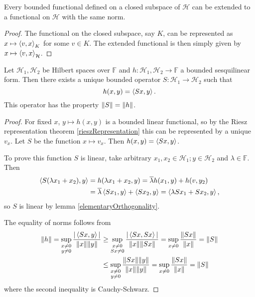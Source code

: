 \begin{corollary}
Every bounded functional defined on a closed subspace of $\mathcal{H}$ can be extended to a functional on $\mathcal{H}$ with the same norm.
\end{corollary}
\begin{proof}
The functional on the closed subspace, say $K$, can be represented as $x\mapsto \left\langle v,x \right\rangle_K$ for some $v\in K$. The extended functional is then simply given by $x\mapsto \left\langle v,x \right\rangle_\mathcal{H}$.
\end{proof}

\begin{proposition} \label{sesquilinearRepresentation}
Let $\mathcal{H}_1,\mathcal{H}_2$ be Hilbert spaces over $\mathbb{F}$ and $h:\mathcal{H}_1,\mathcal{H}_2\to\mathbb{F}$ a bounded sesquilinear form. Then there exists a unique bounded operator $S:\mathcal{H}_1 \to \mathcal{H}_2$ such that
\[ h(x,y) = \left\langle Sx,y \right\rangle. \]
This operator has the property $\lVert S\rVert = \lVert h\rVert$.
\end{proposition}
\begin{proof}
For fixed $x$, $y\mapsto h(x,y)$ is a bounded linear functional, so by the Riesz representation theorem \ref{rieszRepresentation} this can be represented by a unique $v_x$. Let $S$ be the function $x\mapsto v_x$. Then $h(x,y) = \left\langle Sx,y \right\rangle$.

To prove this function $S$ is linear, take arbitrary $x_1,x_2\in \mathcal{H}_1;y\in \mathcal{H}_2$ and $\lambda \in \mathbb{F}$. Then
\begin{align*}
\left\langle S(\lambda x_1+ x_2),y \right\rangle &= h(\lambda x_1+ x_2, y) = \overline{\lambda} h(x_1,y)+h(v,y_2) \\
&= \overline{\lambda} \left\langle Sx_1, y \right\rangle + \left\langle Sx_2, y \right\rangle = \left\langle \lambda Sx_1 + Sx_2,y \right\rangle,
\end{align*}
so $S$ is linear by lemma \ref{elementaryOrthogonality}.

The equality of norms follows from
\begin{align*}
\lVert h\rVert = \sup_{\substack{x\neq 0 \\ y\neq 0}}\frac{|\left\langle Sx,y \right\rangle|}{\lVert x\rVert\lVert y\rVert} &\geq \sup_{\substack{x\neq 0 \\ Sx\neq 0}}\frac{|\left\langle Sx,Sx \right\rangle|}{\lVert x\rVert\lVert Sx\rVert} = \sup_{x\neq 0}\frac{\lVert Sx\rVert}{\lVert x\rVert} = \lVert S\rVert \\
&\leq \sup_{\substack{x\neq 0 \\ y\neq 0}}\frac{\lVert Sx\rVert\lVert y\rVert}{\lVert x\rVert\lVert y\rVert} = \sup_{x\neq 0}\frac{\lVert Sx\rVert}{\lVert x\rVert} = \lVert S\rVert
\end{align*}
where the second inequality is Cauchy-Schwarz.
\end{proof}

